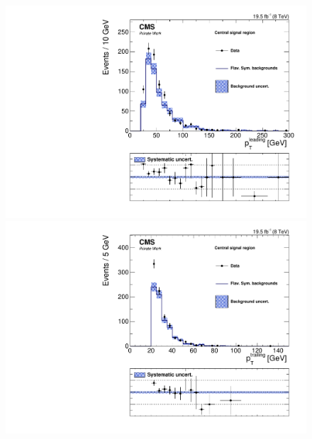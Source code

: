 \begin{figure}[htbp]
\begin{minipage}[t]{0.49\textwidth}
\end{minipage}
\begin{minipage}[t]{0.49\textwidth}
  \includegraphics[width=\textwidth]{plots/results/rSFOFDependencies/rSFOFDependency_SignalCentral_LeadingPt_Full2012_SF_lowMass.pdf}
\end{minipage}
\begin{minipage}[t]{0.49\textwidth}
\includegraphics[width=\textwidth]{plots/results/rSFOFDependencies/rSFOFDependency_SignalCentral_TrailingPt_Full2012_SF_lowMass.pdf}
\end{minipage}
\begin{minipage}[t]{0.49\textwidth}

\end{minipage}
\end{figure}

